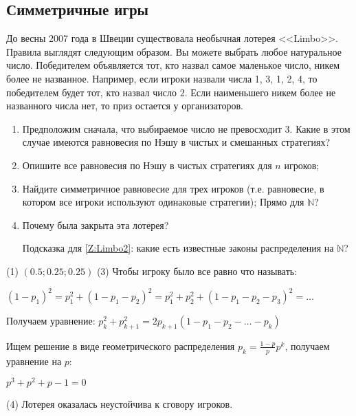 \subsection{Симметричные игры}

\begin{problem}[Limbo.]
До весны 2007 года в Швеции существовала необычная лотерея <<Limbo>>. Правила выглядят следующим образом. Вы можете выбрать любое натуральное число. Победителем объявляется тот, кто назвал самое маленькое число, никем более не названное. Например, если игроки назвали числа 1, 3, 1, 2, 4, то победителем будет тот, кто назвал число 2. Если наименьшего никем более не названного числа нет, то приз остается у организаторов. \par
\begin{enumerate}
\item Предположим сначала, что выбираемое число не превосходит 3. Какие в этом случае имеются равновесия по Нэшу в чистых и смешанных стратегиях?
\item  Опишите все равновесия по Нэшу в чистых стратегиях для $n$ игроков;\par
\item\label{Z:Limbo2} Найдите симметричное равновесие для трех игроков (т.е. равновесие, в котором все игроки используют одинаковые стратегии); {\red Прямо для $\mathbb{N}$}? \par
\item  Почему была закрыта эта лотерея? \par
Подсказка для \ref{Z:Limbo2}: какие есть известные законы распределения на $\mathbb{N}$?
\end{enumerate}

\begin{sol}
(1)
$(0.5;0.25;0.25)$
(3)
Чтобы игроку было все равно что называть:

$(1-p_1)^2 = p_1^2+(1-p_1-p_2)^2 = p_1^2+p_2^2+(1-p_1-p_2-p_3)^2 =\ldots $

Получаем уравнение:
$p_{k}^{2}+p_{k+1}^{2}=2p_{k+1}(1-p_{1}-p_{2}-\ldots -p_{k})$

Ищем решение в виде геометрического распределения $p_{k}=\frac{1-p}{p}p^{k}$, получаем уравнение на $p$:\par
$p^{3}+p^{2}+p-1=0$ \par

(4)  Лотерея оказалась неустойчива к сговору игроков.
\end{sol}
\end{problem}




